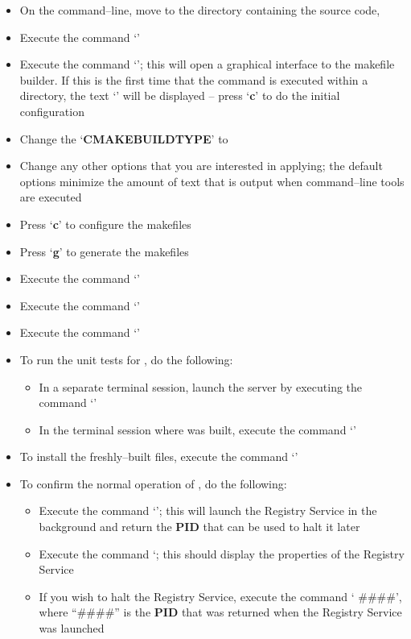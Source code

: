 \begin{itemize}
\item On the command--line, move to the directory containing the \mplusm{} source code,
\item Execute the command `'
\item Execute the command `'; this will open a graphical interface to the
makefile builder. If this is the first time that the command is executed within a
directory, the text `' will be displayed -- press `\textbf{c}' to do
the initial configuration
\item Change the `\textbf{CMAKE\fatUnderscore{}BUILD\fatUnderscore{}TYPE}' to
\item Change any other options that you are interested in applying; the default options
minimize the amount of text that is output when \mplusm{} command--line tools are
executed
\item Press `\textbf{c}' to configure the makefiles
\item Press `\textbf{g}' to generate the makefiles
\item Execute the command `'
\item Execute the command `'
\item Execute the command `'
\item To run the unit tests for \mplusm{}, do the following:
\begin{itemize}
\item In a separate terminal session, launch the \yarp{} server by executing the command
`'
\item In the terminal session where \mplusm{} was built, execute the command
`'
\end{itemize}
\item To install the freshly--built \mplusm{} files, execute the command
`'
\item To confirm the normal operation of \mplusm{}, do the following:
\begin{itemize}
\item Execute the command `'; this will launch the Registry
Service in the background and return the \textbf{PID} that can be used to halt it later
\item Execute the command `; this should display the properties
of the Registry Service
\item If you wish to halt the Registry Service, execute the command `
\#\#\#\#', where ``\#\#\#\#'' is the \textbf{PID} that was returned when the Registry
Service was launched
\end{itemize}
\end{itemize}
